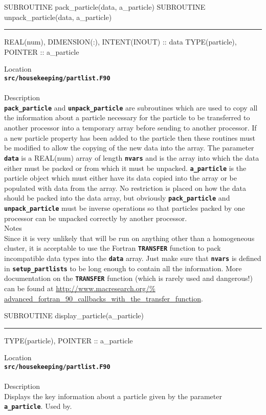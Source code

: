 \documentclass[12pt,a4paper]{article}
\newcommand{\HRule}{\rule[0.3cm]{\linewidth}{0.5mm}}
\newcommand{\inlinecode}[1]{{\color{warwickred} \bf\texttt{#1}}}
\newcommand{\EPOCH}{{\color{warwickdark}\fontfamily{phv}\selectfont{EPOCH}}}
\begin{document}
\pagebreak
\begin{codedef}
SUBROUTINE   pack_particle(data, a_particle)
SUBROUTINE unpack_particle(data, a_particle)
\HRule
REAL(num), DIMENSION(:), INTENT(INOUT) :: data
TYPE(particle), POINTER :: a_particle
\end{codedef}
\vspace{1cm}
{\Large Location\\}
\inlinecode{src/housekeeping/partlist.F90}\\
\\[0.5cm]
{\Large Description\\}
\inlinecode{pack\_particle} and \inlinecode{unpack\_particle} are subroutines
which are used to copy all the information about a particle
necessary for the particle to be transferred to another processor into a
temporary array before sending to another processor. If a new particle property
has been added to the particle then these routines must be modified to allow
the copying of the new data into the array. The parameter \inlinecode{data} is
a REAL(num) array of length \inlinecode{nvars} and is the array into which the
data either must be packed or from which it must be
unpacked. \inlinecode{a\_particle} is the particle object which must either have
its data copied into the array or be
populated with data from the array. No restriction is placed on how the
data should be packed into the data array, but obviously
\inlinecode{pack\_particle} and \inlinecode{unpack\_particle} must be inverse
operations so that particles packed by one processor can be unpacked correctly
by another processor.
\\[0.5cm]
{\Large Notes\\}
Since it is very unlikely that {\EPOCH} will be run on anything other than a
homogeneous cluster, it is acceptable to use the Fortran \inlinecode{TRANSFER}
function to pack incompatible data types into the \inlinecode{data} array. Just
make sure that \inlinecode{nvars} is defined in \inlinecode{setup\_partlists}
to be long enough to contain all the information. More documentation on the
\inlinecode{TRANSFER} function (which is rarely used and dangerous!) can be
found at \url{http://www.macresearch.org/%
advanced_fortran_90_callbacks_with_the_transfer_function}.

\pagebreak
\begin{codedef}
SUBROUTINE display_particle(a_particle)
\HRule
TYPE(particle), POINTER :: a_particle
\end{codedef}
\vspace{1cm}
{\Large Location\\}
\inlinecode{src/housekeeping/partlist.F90}\\
\\[0.5cm]
{\Large Description\\}
Displays the key information about a particle given by the parameter
\inlinecode{a\_particle}. Used by\linebreak \inlinecode{compare\_particles}.
\\[0.5cm]
\end{document}
